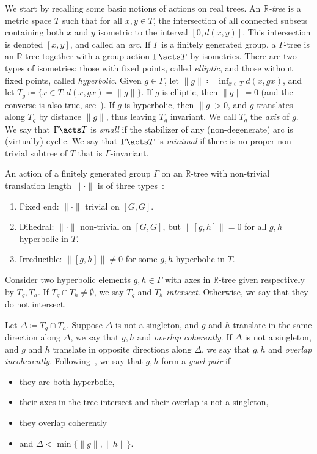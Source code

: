 We start by recalling some basic notions of actions on real trees.
An \emph{$\mathbb{R}$-tree} is a metric space $T$ such that for
all $x,y \in T$, the intersection of all connected subsets containing both $x$ and $y$ isometric to the interval $[0, d(x, y)]$. This intersection is denoted
$[x, y]$, and called an \emph{arc}. If $\Gamma$ is a finitely generated group, a $\Gamma$-tree is an $\mathbb{R}$-tree together with a group action $\Gamma \acts T$ by isometries.
There are two types of isometries: those with fixed points, called \emph{elliptic}, and those without fixed points, called \emph{hyperbolic}.
Given $g\in \Gamma$, let $\| g\|\coloneqq\inf_{x \in T} d(x,gx)$, and let $T_g \coloneqq \{ x\in T : d(x,gx)=\| g\| \}$.
If $g$ is elliptic, then $\| g \| =0$ (and the converse is also true, see~\cite[1.3]{CM87:GroupActions}).
If $g$ is hyperbolic, then $\| g | >0$, and $g$ translates along $T_g$ by distance $\| g\|$, thus leaving $T_g$ invariant. We call $T_g$ the \emph{axis} of $g$.
We say that $\Gamma \acts T$ is \emph{small} if the stabilizer of any (non-degenerate) arc is (virtually) cyclic.
We say that $\Gamma \acts T$ is \emph{minimal} if there is no proper non-trivial subtree of $T$ that is $\Gamma$-invariant.

An action of a finitely generated group $\Gamma$ on an $\mathbb{R}$-tree with non-trivial translation length $\| \cdot \|$ is of three types~\cite[Page~583]{CM87:GroupActions}:
\begin{enumerate}
\item Fixed end: $\| \cdot \|$ trivial on $[G,G]$.
\item Dihedral: $\| \cdot \|$ non-trivial on $[G,G]$, but $\| [g,h] \|=0$ for all $g,h$ hyperbolic in $T$.
\item Irreducible:  $\| [g,h] \| \neq 0$ for some $g,h$ hyperbolic in $T$.
\end{enumerate}

Consider two hyperbolic elements $g, h \in \Gamma$ with axes in $\mathbb{R}$-tree given respectively by $T_g,T_h$.
If $T_g \cap T_h \neq \emptyset$, we say $T_g$ and $T_h$ \emph{intersect}. Otherwise, we say that they do not intersect.

Let $\Delta \coloneqq T_g \cap T_h$. Suppose $\Delta$ is not a singleton, and $g$ and $h$ translate in the same direction along $\Delta$, we say that $g,h$ and \emph{overlap coherently}.
If $\Delta$ is not a singleton, and $g$ and $h$ translate in opposite directions along $\Delta$, we say that $g,h$ and \emph{overlap incoherently}.
Following~\cite[3.2]{CM87:GroupActions}, we say that $g,h$ form a \emph{good pair} if 
\begin{itemize} 
\item they are both hyperbolic, 
\item their axes in the tree intersect and their overlap is not a singleton,
\item they overlap coherently 
\item and $\Delta< \min \{ \| g \|, \| h \| \}$.
\end{itemize}

